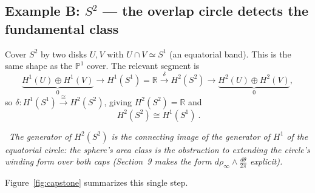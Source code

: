 \documentclass[11pt]{article}
\newcommand{\RR}{\mathbb R}
\newcommand{\PP}{\mathbb P}
\newcommand{\diagnose}[1]{%
  \par\smallskip\noindent{\color{accent}\textbf{Diagnosis.}}\ \emph{#1}\par\smallskip}
\theoremstyle{plain}
\theoremstyle{definition}
\begin{document}
\subsection*{Example B: \(S^2\) --- the overlap circle detects the fundamental class}
Cover $S^2$ by two disks $U,V$ with $U\cap V\simeq S^1$ (an equatorial band).
This is the same shape as the $\PP^1$ cover. The relevant segment is
\[
  \underbrace{H^1(U)\oplus H^1(V)}_{0}\to H^1(S^1)=\RR\xrightarrow{\ \delta\ }
  H^2(S^2)\to \underbrace{H^2(U)\oplus H^2(V)}_{0},
\]
so $\delta\colon H^1(S^1)\xrightarrow{\cong}H^2(S^2)$, giving $H^2(S^2)=\RR$ and
\[
  \boxed{\ H^2(S^2)\cong H^1(S^1)\ }.
\]
\diagnose{The generator of $H^2(S^2)$ is the connecting image of the generator of
$H^1$ of the equatorial circle: the sphere's area class is the obstruction to
extending the circle's winding form over both caps (Section~9 makes the form
$d\rho_\infty\wedge\tfrac{d\theta}{2\pi}$ explicit).}

\noindent Figure~\ref{fig:capstone} summarizes this single step.
\end{document}
